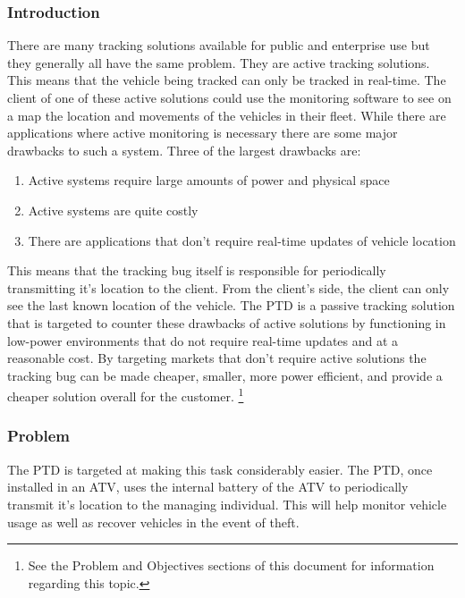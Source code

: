\documentclass[11pt]{article}
\begin{document}
\subsubsection{Introduction}
There are many tracking solutions available for public and enterprise use but they generally all have the same problem. They are active tracking 
solutions. This means that the vehicle being tracked can only be tracked in real-time. The client of one of these active solutions could use the 
monitoring software to see on a map the location and movements of the vehicles in their fleet. While there are applications where 
active monitoring is necessary there are some major drawbacks to such a system. Three of the largest drawbacks are:
\begin{enumerate}
    \item Active systems require large amounts of power and physical space
    \item Active systems are quite costly
    \item There are applications that don't require real-time updates of vehicle location
\end{enumerate}
This means that the tracking bug itself is responsible for periodically transmitting it's location to the client. From the client's side, the client 
can only see the last known location of the vehicle. The PTD is a passive tracking solution that is targeted to counter these drawbacks of active 
solutions by functioning in low-power environments that do not require real-time updates and at a reasonable cost. By targeting markets that don't require 
active solutions the tracking bug can be made cheaper, smaller, more power efficient, and provide a cheaper solution overall for the customer.  
\footnote{See the Problem and Objectives sections of this document for information 
regarding this topic.}


\subsubsection{Problem}
The PTD is targeted at making this task considerably easier. 
The PTD, once installed in an ATV, uses the internal battery of the ATV to periodically transmit it's location to the managing individual. This will help 
monitor vehicle usage as well as recover vehicles in the event of theft.
\end{document}

